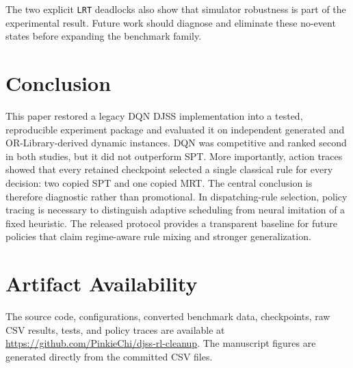 \documentclass[conference]{IEEEtran}
\newcommand{\method}[1]{\textsc{#1}}
\newcommand{\spt}{\method{SPT}}
\newcommand{\mrt}{\method{MRT}}
\begin{document}
The two explicit \texttt{LRT} deadlocks also show that simulator robustness is part of the experimental result. Future work should diagnose and eliminate these no-event states before expanding the benchmark family.

\section{Conclusion}

This paper restored a legacy DQN DJSS implementation into a tested, reproducible experiment package and evaluated it on independent generated and OR-Library-derived dynamic instances. DQN was competitive and ranked second in both studies, but it did not outperform \spt. More importantly, action traces showed that every retained checkpoint selected a single classical rule for every decision: two copied \spt{} and one copied \mrt. The central conclusion is therefore diagnostic rather than promotional. In dispatching-rule selection, policy tracing is necessary to distinguish adaptive scheduling from neural imitation of a fixed heuristic. The released protocol provides a transparent baseline for future policies that claim regime-aware rule mixing and stronger generalization.

\section*{Artifact Availability}

The source code, configurations, converted benchmark data, checkpoints, raw CSV results, tests, and policy traces are available at \url{https://github.com/PinkieChi/djss-rl-cleanup}. The manuscript figures are generated directly from the committed CSV files.


\balance


\end{document}
